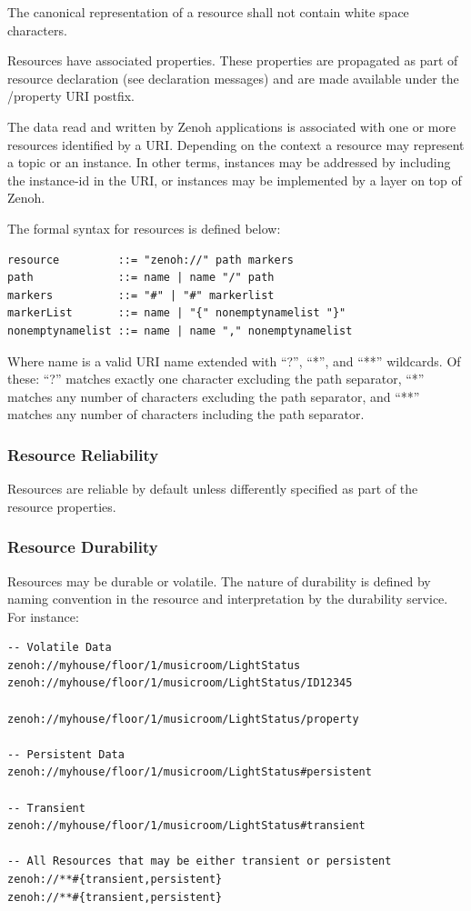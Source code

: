 \documentclass[a4paper,oneside,article]{memoir}
\begin{document}
The canonical representation of a resource shall not contain white space characters.

Resources have associated properties.  These properties are propagated as part of resource
declaration (see declaration messages) and are made available under the /property URI postfix.

The data read and written by Zenoh applications is associated with one or more resources identified
by a URI.  Depending on the context a resource may represent a topic or an instance.  In other
terms, instances may be addressed by including the instance-id in the URI, or instances may be
implemented by a layer on top of Zenoh.

The formal syntax for resources is defined below:
\begin{verbatim}
resource         ::= "zenoh://" path markers
path             ::= name | name "/" path 
markers          ::= "#" | "#" markerlist
markerList       ::= name | "{" nonemptynamelist "}"
nonemptynamelist ::= name | name "," nonemptynamelist
\end{verbatim}

Where name is a valid URI name extended with ``?'', ``*'', and ``**'' wildcards.  Of these: ``?''
matches exactly one character excluding the path separator, ``*'' matches any number of characters
excluding the path separator, and ``**'' matches any number of characters including the path
separator.

\subsubsection{Resource Reliability}

Resources are reliable by default unless differently specified as part of the resource properties.

\subsubsection{Resource Durability}

Resources may be durable or volatile. The nature of durability is defined by naming convention in
the resource and interpretation by the durability service. For instance:

\begin{verbatim}
-- Volatile Data
zenoh://myhouse/floor/1/musicroom/LightStatus 
zenoh://myhouse/floor/1/musicroom/LightStatus/ID12345 

zenoh://myhouse/floor/1/musicroom/LightStatus/property

-- Persistent Data
zenoh://myhouse/floor/1/musicroom/LightStatus#persistent

-- Transient    
zenoh://myhouse/floor/1/musicroom/LightStatus#transient

-- All Resources that may be either transient or persistent 
zenoh://**#{transient,persistent}
zenoh://**#{transient,persistent}
\end{verbatim}
\end{document}
